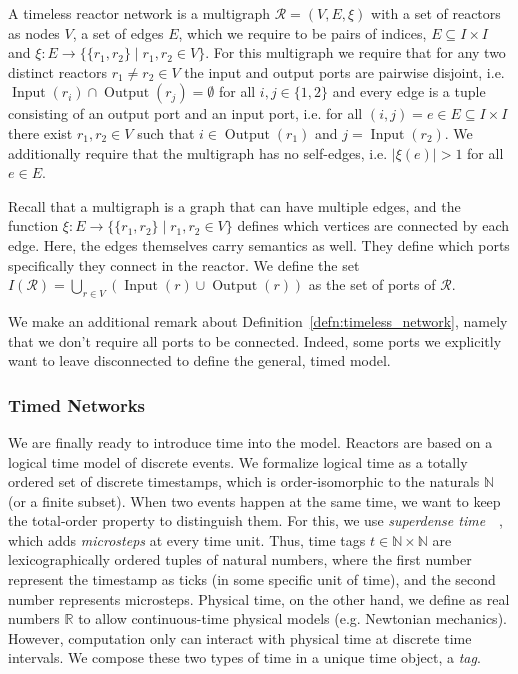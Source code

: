 \begin{defn}
    \label{defn:timeless_network}
A timeless reactor network is a multigraph $\mathcal{R} = (V,E,\xi)$ with a set of reactors as nodes $V$,
a set of edges $E$, which we require to be pairs of indices, $E \subseteq I \times I$ and $\xi : E \rightarrow \{ \{r_1, r_2\} \mid r_1, r_2 \in V \}$.
For this multigraph we require that for any two distinct reactors $r_1 \neq r_2 \in V$ the input and output ports are pairwise disjoint,
i.e. $\operatorname{Input}(r_i) \cap \operatorname{Output}(r_j) = \emptyset$ for all $i,j \in \{ 1, 2 \}$ and every edge is a tuple consisting of an output port and an input port,
i.e. for all $(i,j) = e \in E \subseteq I \times I$ there exist $r_1,r_2 \in V$ such that $i \in \operatorname{Output}(r_1)$ and $j = \operatorname{Input}(r_2)$.
We additionally require that the multigraph has no self-edges, i.e. $|\xi(e)| > 1$ for all $e \in E$.
\end{defn}

Recall that a multigraph is a graph that can have multiple edges, and the function $\xi : E \rightarrow \{ \{r_1, r_2\} \mid r_1, r_2 \in V \}$ defines which vertices are connected by each edge.
Here, the edges themselves carry semantics as well. They define which ports specifically they connect in the reactor.
We define the set $I(\mathcal{R}) = \bigcup_{r \in V}(\operatorname{Input}(r) \cup \operatorname{Output}(r))$ as the set of ports of $\mathcal{R}$.

We make an additional remark about Definition~\ref{defn:timeless_network}, namely that we don't require all ports to be connected.
Indeed, some ports we explicitly want to leave disconnected to define the general, timed model. 

\subsubsection{Timed Networks}

We are finally ready to introduce time into the model.
Reactors are based on a logical time model of discrete events.
We formalize logical time as a totally ordered set of discrete timestamps, which is order-isomorphic to the naturals $\mathbb{N}$ (or a finite subset). 
When two events happen at the same time, we want to keep the total-order property to distinguish them.
For this, we use \emph{superdense time}~\cite{superdense,Ptolemaeus:14:SystemDesign}~, which adds \emph{microsteps} at every time unit.
Thus, time tags $t \in \mathbb{N} \times \mathbb{N}$ are lexicographically ordered tuples of natural numbers, where the first number represent the timestamp as ticks (in some specific unit of time), and the second number represents microsteps.
Physical time, on the other hand, we define as real numbers $\mathbb{R}$ to allow continuous-time physical models (e.g. Newtonian mechanics).
However, computation only can interact with physical time at discrete time intervals.
We compose these two types of time in a unique time object, a \emph{tag}.

